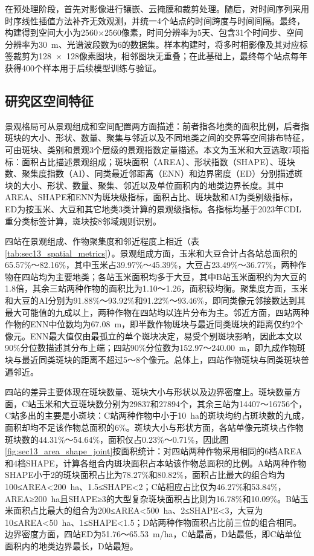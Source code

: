 在预处理阶段，首先对影像进行镶嵌、云掩膜和裁剪处理。随后，对时间序列采用时序线性插值方法补齐无效观测，并统一4个站点的时间跨度与时间间隔。最终，构建得到空间大小为2560$\times$2560像素，时间分辨率为5天、包含31个时间步、空间分辨率为30~m、光谱波段数为6的数据集。样本构建时，将多时相影像及其对应标签裁剪为128~$\times$~128像素图块，相邻图块无重叠；在此基础上，最终每个站点每年获得400个样本用于后续模型训练与验证。

\subsection{研究区空间特征}

景观格局可从景观组成和空间配置两方面描述：前者指各地类的面积比例，后者指斑块的大小、形状、数量、聚集与邻近以及不同地类之间的交界等空间排布特征，可由斑块、类别和景观3个层级的景观指数定量描述\citep{mcgarigal2023fragstats}。本文为玉米和大豆选取7项指标：面积占比描述景观组成；斑块面积（AREA）、形状指数（SHAPE）、斑块数、聚集度指数（AI）、同类最近邻距离（ENN）和边界密度（ED）分别描述斑块的大小、形状、数量、聚集、邻近以及单位面积内的地类边界长度。其中AREA、SHAPE和ENN为斑块级指标，面积占比、斑块数和AI为类别级指标，ED为按玉米、大豆和其它地类3类计算的景观级指标。各指标均基于2023年CDL重分类标签计算，斑块按8邻域规则识别。

四站在景观组成、作物聚集度和邻近程度上相近（表\ref{tab:sec13_spatial_metrics}）。景观组成方面，玉米和大豆合计占各站总面积的65.57\%～82.16\%，其中玉米占39.97\%～45.39\%，大豆占23.49\%～36.77\%，两种作物在四站均为主要地类；各站玉米面积均多于大豆，其中B站玉米面积约为大豆的1.8倍，其余三站两种作物的面积比为1.10～1.26，面积较均衡。聚集度方面，玉米和大豆的AI分别为91.88\%～93.92\%和91.22\%～93.46\%，即同类像元邻接数达到其最大可能值的九成以上，两种作物在四站均以连片分布为主。邻近方面，四站两种作物的ENN中位数均为67.08~m，即半数作物斑块与最近同类斑块的距离仅约2个像元。ENN最大值仅由最孤立的单个斑块决定，易受个别斑块影响，因此本文以90\%分位数描述其分布上端；四站90\%分位数为152.97～240.00~m，即九成作物斑块与最近同类斑块的距离不超过5～8个像元。总体上，四站作物斑块与同类斑块普遍邻近。

四站的差异主要体现在斑块数量、斑块大小与形状以及边界密度上。斑块数量方面，C站玉米和大豆斑块数分别为29837和27894个，其余三站为14407～16756个，C站多出的主要是小斑块：C站两种作物中小于10~ha的斑块均约占斑块数的九成，面积却均不足该作物总面积的6\%。斑块大小与形状方面，各站单像元斑块占作物斑块数的44.31\%～54.64\%，面积仅占0.23\%～0.71\%，因此图\ref{fig:sec13_area_shape_joint}按面积统计：对四站两种作物采用相同的6档AREA和4档SHAPE，计算各组合内斑块面积占本站该作物总面积的比例。A站两种作物SHAPE小于2的斑块面积占比为78.27\%和80.82\%，面积占比最大的组合均为100≤AREA<200~ha、1.5≤SHAPE<2；C站相应占比仅为46.27\%和53.84\%，AREA≥200~ha且SHAPE≥3的大型复杂斑块面积占比则为16.78\%和10.09\%。B站玉米面积占比最大的组合为200≤AREA<500~ha、2≤SHAPE<3，大豆为10≤AREA<50~ha、1≤SHAPE<1.5；D站两种作物面积占比前三位的组合相同。边界密度方面，四站ED为51.76～65.53~m/ha，C站最高，D站最低，即C站单位面积内的地类边界最长，D站最短。

